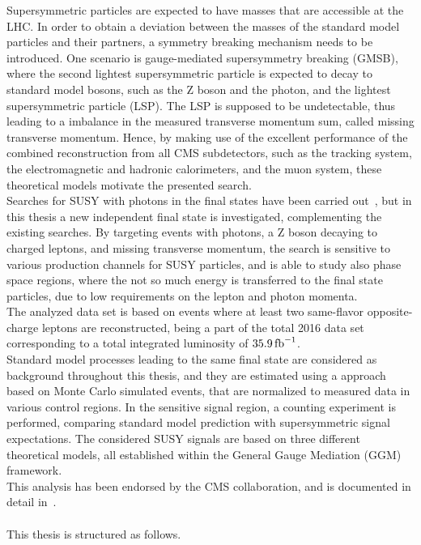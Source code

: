 Supersymmetric particles are expected to have masses that are accessible at the LHC. In order to obtain a deviation between the masses of the standard model particles and their partners, a symmetry breaking mechanism needs to be introduced. One scenario is gauge-mediated supersymmetry breaking (GMSB), where the second lightest supersymmetric particle is expected to decay to standard model bosons, such as the Z boson and the photon, and the lightest supersymmetric particle (LSP). The LSP is supposed to be undetectable, thus leading to a imbalance in the measured transverse momentum sum, called missing transverse momentum. Hence, by making use of the excellent performance of the combined reconstruction from all CMS subdetectors, such as the tracking system, the electromagnetic and hadronic calorimeters, and the muon system, these theoretical models motivate the presented search.\\
Searches for SUSY with photons in the final states have been carried out~\cite{PhotonHT,PhotonMet,PhotonBJet,PhotonLepton}, but in this thesis a new independent final state is investigated, complementing the existing searches. By targeting events with photons, a Z boson decaying to charged leptons, and missing transverse momentum, the search is sensitive to various production channels for SUSY particles, and is able to study also phase space regions, where the not so much energy is transferred to the final state particles, due to low requirements on the lepton and photon momenta.\\
The analyzed data set is based on events where at least two same-flavor  opposite-charge leptons are reconstructed, being a part of the total 2016 data set corresponding to a total integrated luminosity of $35.9\mbox{\ensuremath{\,\text{fb}^\text{$-$1}}}$.\\
Standard model processes leading to the same final state are considered as background throughout this thesis, and they are estimated using a approach based on Monte Carlo simulated events, that are normalized to measured data in various control regions. In the sensitive signal region, a counting experiment is performed, comparing standard model prediction with supersymmetric signal expectations. The considered SUSY signals are based on three different theoretical models, all established within the General Gauge Mediation (GGM) framework.\\
This analysis has been endorsed by the CMS collaboration, and is documented in detail in~\cite{MyAN}.\\\\
This thesis is structured as follows.
